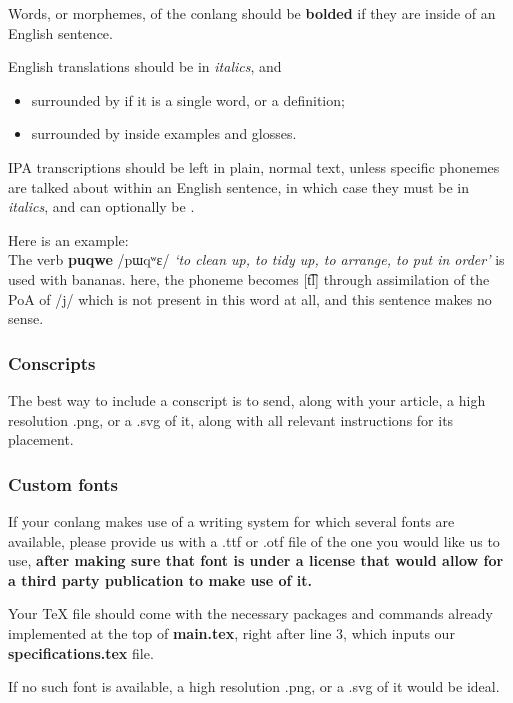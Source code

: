 Words, or morphemes, of the conlang should be \textbf{bolded} if they are inside of an English sentence. 

English translations should be in \textit{italics}, and

\begin{itemize}
    \item surrounded by  if it is a single word, or a definition;
    \item surrounded by  inside examples and glosses.
\end{itemize}

IPA transcriptions should be left in plain, normal text, unless specific phonemes are talked about within an English sentence, in which case they must be in \textit{italics}, and can optionally be .

Here is an example: \\
The verb \textbf{puqwe} /pɯqʷɛ/ \textit{`to clean up, to tidy up, to arrange, to put in order'} is used with bananas. here, the phoneme  becomes [t͡l] through assimilation of the PoA of /j/ which is not present in this word at all, and this sentence makes no sense.

\subsubsection*{Conscripts}

The best way to include a conscript is to send, along with your article, a high resolution .png, or a .svg of it, along with all relevant instructions for its placement.

\subsubsection{Custom fonts}

If your conlang makes use of a writing system for which several fonts are available, please provide us with a .ttf or .otf file of the one you would like us to use, \textbf{after making sure that font is under a license that would allow for a third party publication to make use of it.}

Your TeX file should come with the necessary packages and commands already implemented at the top of \textbf{main.tex}, right after line 3, which inputs our \textbf{specifications.tex} file.

If no such font is available, a high resolution .png, or a .svg of it would be ideal.

